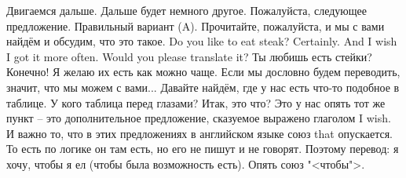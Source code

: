 \documentclass[main.tex]{subfiles}
\begin{document}
Двигаемся дальше.
Дальше будет немного другое.
Пожалуйста, следующее предложение.
Правильный вариант (A).
Прочитайте, пожалуйста, и мы с вами найдём и обсудим, что это такое.
Do you like to eat steak?
Certainly.
And I wish I got it more often.
Would you please translate it?
Ты любишь есть стейки?
Конечно! Я желаю их есть как можно чаще.
Если мы дословно будем переводить, значит, что мы можем с вами...
Давайте найдём, где у нас есть что-то подобное в таблице.
У кого таблица перед глазами?
Итак, это что?
Это у нас опять тот же пункт -- это дополнительное предложение, сказуемое выражено глаголом I wish.
И важно то, что в этих предложениях в английском языке союз that опускается.
То есть по логике он там есть, но его не пишут и не говорят.
Поэтому перевод: я хочу, чтобы я ел (чтобы была возможность есть).
Опять союз "<чтобы">.
\end{document}
